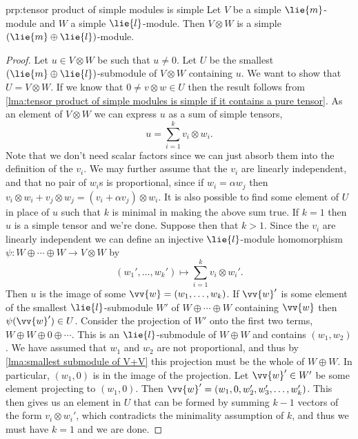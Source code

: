 \documentclass[fleqn]{NotesClass}
\begin{document}
    \begin{prp}{}{prp:tensor product of simple modules is simple}
        Let \(V\) be a simple \(\lie{m}\)-module and \(W\) a simple \(\lie{l}\)-module.
        Then \(V \otimes W\) is a simple \((\lie{m} \oplus \lie{l})\)-module.
        \begin{proof}
            Let \(u \in V \otimes W\) be such that \(u \ne 0\).
            Let \(U\) be the smallest \((\lie{m} \oplus \lie{l})\)-submodule of \(V \otimes W\) containing \(u\).
            We want to show that \(U = V \otimes W\).
            If we know that \(0 \ne v \otimes w \in U\) then the result follows from \cref{lma:tensor product of simple modules is simple if it contains a pure tensor}.
            As an element of \(V \otimes W\) we can express \(u\) as a sum of simple tensors,
            \begin{equation}
                u = \sum_{i=1}^k v_i \otimes w_i.
            \end{equation}
            Note that we don't need scalar factors since we can just absorb them into the definition of the \(v_i\).
            We may further assume that the \(v_i\) are linearly independent, and that no pair of \(w_i\)s is proportional, since if \(w_i = \alpha w_j\) then \(v_i \otimes w_i + v_j \otimes w_j = (v_i + \alpha v_j) \otimes w_i\).
            It is also possible to find some element of \(U\) in place of \(u\) such that \(k\) is minimal in making the above sum true.
            If \(k = 1\) then \(u\) is a simple tensor and we're done.
            Suppose then that \(k > 1\).
            Since the \(v_i\) are linearly independent we can define an injective \(\lie{l}\)-module homomorphism \(\psi \colon W \oplus \dotsb \oplus W \to V \otimes W\) by
            \begin{equation}
                (w_1', \dotsc, w_k') \mapsto \sum_{i=1}^k v_i \otimes w_i'.
            \end{equation}
            Then \(u\) is the image of some \(\vv{w} = (w_1, \dotsc, w_k)\).
            If \(\vv{w}'\) is some element of the smallest \(\lie{l}\)-submodule \(W'\) of \(W \oplus \dotsb \oplus W\) containing \(\vv{w}\) then \(\psi(\vv{w}') \in U\).
            Consider the projection of \(W'\) onto the first two terms, \(W \oplus W \oplus 0 \oplus \dotsb\).
            This is an \(\lie{l}\)-submodule of \(W \oplus W\) and contains \((w_1, w_2)\).
            We have assumed that \(w_1\) and \(w_2\) are not proportional, and thus by \cref{lma:smallest submodule of V+V} this projection must be the whole of \(W \oplus W\).
            In particular, \((w_1, 0)\) is in the image of the projection.
            Let \(\vv{w}' \in W'\) be some element projecting to \((w_1, 0)\).
            Then \(\vv{w}' = (w_1, 0, w_2', w_3', \dotsc, w_k')\).
            This then gives us an element in \(U\) that can be formed by summing \(k - 1\) vectors of the form \(v_i \otimes w_i'\), which contradicts the minimality assumption of \(k\), and thus we must have \(k = 1\) and we are done.
        \end{proof}
    \end{prp}
    
\end{document}
